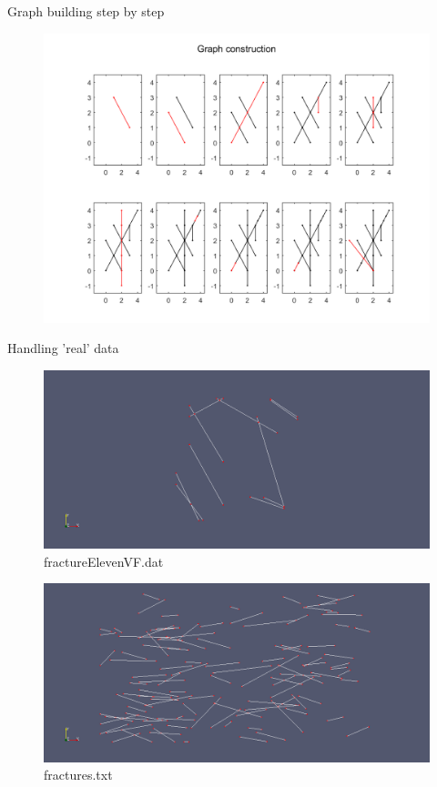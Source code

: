 \documentclass[11pt]{beamer}
\begin{document}
	\begin{frame}{Graph building step by step}
		\begin{figure}
			\centering 
			\includegraphics[width=.9\textwidth]{"graph_building_process"}
		\end{figure}
	\end{frame}

	\begin{frame}{Handling 'real' data}
		\begin{figure}
			\centering 
			\includegraphics[width=.9\textwidth]{"graph1"}
			\caption{fractureElevenVF.dat}
		\end{figure}
	\end{frame}

	\begin{frame}
		\begin{figure}
			\centering 
			\includegraphics[width=.9\textwidth]{"graph2"}
			\caption{fractures.txt}
		\end{figure}
	\end{frame}
\end{document}
